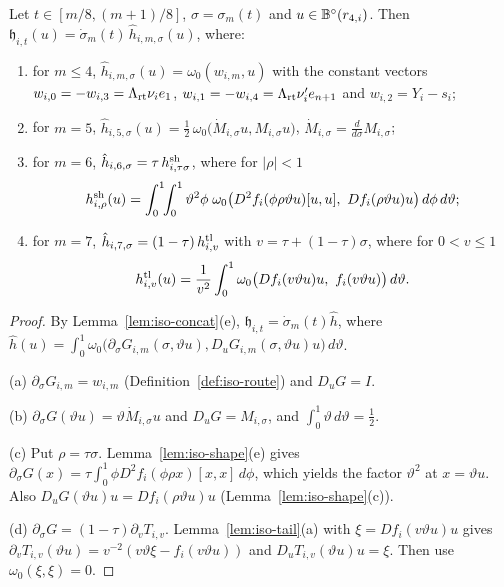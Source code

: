 \begin{lemma}\label{lem:iso-stage-primitives}
Let $t\in[m/8,(m+1)/8]$, $\sigma=\sigma_m(t)$ and $u\in\mathbb{B}^\circ(r_{4,i})$. Then
$\mathfrak h_{i,t}(u)=\dot\sigma_m(t)\,\hat h_{i,m,\sigma}(u)$, where:
\begin{enumerate}[label=(\alph*)]
\item for $m\le4$, $\hat h_{i,m,\sigma}(u)=\omega_0(w_{i,m},u)$ with the constant vectors
 $w_{i,0}=-w_{i,3}=\Lambda_{\rm rt}\nu_ie_1$, $w_{i,1}=-w_{i,4}=\Lambda_{\rm rt}\nu'_ie_{n+1}$ and $w_{i,2}=Y_i-s_i$;
\item for $m=5$, $\hat h_{i,5,\sigma}(u)=\tfrac12\,\omega_0\big(\dot M_{i,\sigma}u,M_{i,\sigma}u\big)$, $\dot M_{i,\sigma}=\frac{d}{d\sigma}M_{i,\sigma}$;
\item for $m=6$, $\hat h_{i,6,\sigma}=\tau\,h^{\rm sh}_{i,\tau\sigma}$, where for $|\rho|<1$
 \[
  h^{\rm sh}_{i,\rho}(u)=\int_0^1\!\!\int_0^1\vartheta^2\phi\;
  \omega_0\big(D^2f_i(\phi\rho\vartheta u)[u,u],\ Df_i(\rho\vartheta u)u\big)\,d\phi\,d\vartheta ;
 \]
\item for $m=7$, $\hat h_{i,7,\sigma}=(1-\tau)\,h^{\rm tl}_{i,v}$ with $v=\tau+(1-\tau)\sigma$, where for $0<v\le1$
 \[
  h^{\rm tl}_{i,v}(u)=\frac1{v^2}\int_0^1\omega_0\big(Df_i(v\vartheta u)u,\ f_i(v\vartheta u)\big)\,d\vartheta .
 \]
\end{enumerate}
\end{lemma}

\begin{proof}
By Lemma~\ref{lem:iso-concat}(e), $\mathfrak h_{i,t}=\dot\sigma_m(t)\hat h$, where
$\hat h(u)=\int_0^1\omega_0\big(\partial_\sigma G_{i,m}(\sigma,\vartheta u),D_uG_{i,m}(\sigma,\vartheta u)u\big)\,d\vartheta$.

(a) $\partial_\sigma G_{i,m}=w_{i,m}$ (Definition~\ref{def:iso-route}) and $D_uG=I$.

(b) $\partial_\sigma G(\vartheta u)=\vartheta\dot M_{i,\sigma}u$ and $D_uG=M_{i,\sigma}$, and $\int_0^1\vartheta\,d\vartheta=\frac12$.

(c) Put $\rho=\tau\sigma$. Lemma~\ref{lem:iso-shape}(e) gives $\partial_\sigma G(x)=\tau\int_0^1\phi D^2f_i(\phi\rho x)[x,x]\,d\phi$, which yields the factor $\vartheta^2$ at $x=\vartheta u$. Also $D_uG(\vartheta u)u=Df_i(\rho\vartheta u)u$ (Lemma~\ref{lem:iso-shape}(c)).

(d) $\partial_\sigma G=(1-\tau)\partial_vT_{i,v}$. Lemma~\ref{lem:iso-tail}(a) with $\xi=Df_i(v\vartheta u)u$ gives $\partial_vT_{i,v}(\vartheta u)=v^{-2}(v\vartheta\xi-f_i(v\vartheta u))$ and $D_uT_{i,v}(\vartheta u)u=\xi$. Then use $\omega_0(\xi,\xi)=0$.
\end{proof}

